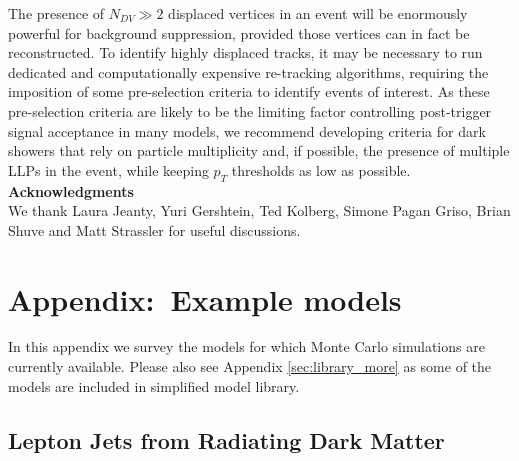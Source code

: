 \begin{enumerate}
The presence of $N_{DV}\gg 2$ displaced vertices in an event will be enormously powerful for background suppression, provided those vertices can in fact be reconstructed. To identify highly displaced tracks, it may be necessary to run dedicated and  computationally expensive re-tracking algorithms,  requiring the imposition of some pre-selection criteria to identify events of interest.   As these pre-selection criteria are likely to be the limiting factor controlling post-trigger signal acceptance in many models, we recommend developing criteria for dark showers that rely on particle multiplicity and, if possible,  the presence of multiple LLPs in the event, while keeping $p_T$ thresholds as low as possible.  \\

\vspace{1cm}
\textbf{Acknowledgments}\\
We thank Laura Jeanty, Yuri Gershtein, Ted Kolberg, Simone Pagan Griso, Brian Shuve and Matt Strassler for useful discussions.

\section{Appendix:~Example models}
\label{sec:darkshowermodels}
In this appendix we survey the models for which  Monte Carlo simulations are currently available. Please also see Appendix \ref{sec:library_more} as some of the models are included in simplified model library.

\subsection{Lepton Jets from Radiating Dark Matter }




\end{enumerate}
